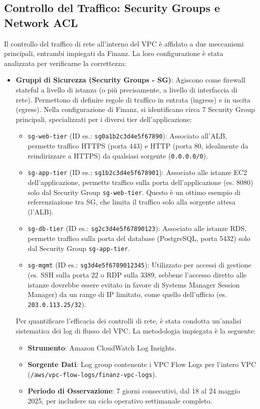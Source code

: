 \subsection{Controllo del Traffico: Security Groups e Network ACL}
\label{subsec:sg-nacl_cap2}
Il controllo del traffico di rete all'interno del VPC è affidato a due meccanismi principali, entrambi impiegati da Finanz. La loro configurazione è stata analizzata per verificarne la correttezza:
\begin{itemize}
\item \textbf{Gruppi di Sicurezza (Security Groups - SG)}: Agiscono come firewall stateful a livello di istanza (o più precisamente, a livello di interfaccia di rete). Permettono di definire regole di traffico in entrata (ingress) e in uscita (egress). Nella configurazione di Finanz, si identificano circa 7 Security Group principali, specializzati per i diversi tier dell'applicazione:
\begin{itemize}
\item \texttt{sg-web-tier} (ID es.: \texttt{sg\discretionary{-}{}{-}0a1b2c3d4e5f67890}): Associato all'ALB, permette traffico HTTPS (porta 443) e HTTP (porta 80, idealmente da reindirizzare a HTTPS) da qualsiasi sorgente (\texttt{0.0.0.0/0}).
\item \texttt{sg-app-tier} (ID es.: \texttt{sg\discretionary{-}{}{-}1b2c3d4e5f678901}): Associato alle istanze EC2 dell'applicazione, permette traffico sulla porta dell'applicazione (es. 8080) solo dal Security Group \texttt{sg-web-tier}. Questo è un ottimo esempio di referenziazione tra SG, che limita il traffico solo alla sorgente attesa (l'ALB).
\item \texttt{sg-db-tier} (ID es.: \texttt{sg\discretionary{-}{}{-}2c3d4e5f67890123}): Associato alle istanze RDS, permette traffico sulla porta del database (PostgreSQL, porta 5432) solo dal Security Group \texttt{sg-app-tier}.
\item \texttt{sg-mgmt} (ID es.: \texttt{sg\discretionary{-}{}{-}3d4e5f6789012345}): Utilizzato per accessi di gestione (es. SSH sulla porta 22 o RDP sulla 3389, sebbene l'accesso diretto alle istanze dovrebbe essere evitato in favore di Systems Manager Session Manager) da un range di IP limitato, come quello dell'ufficio (es. \texttt{203.0.113.25/32}).
\end{itemize}
Per quantificare l'efficacia dei controlli di rete, è stata condotta un'analisi sistematica dei log di flusso del VPC. La metodologia impiegata è la seguente:

\begin{itemize}
    \item \textbf{Strumento}: Amazon CloudWatch Log Insights.
    \item \textbf{Sorgente Dati}: Log group contenente i VPC Flow Logs per l'intero VPC (\texttt{/aws/vpc-flow-logs/finanz-vpc-logs}).
    \item \textbf{Periodo di Osservazione}: 7 giorni consecutivi, dal 18 al 24 maggio 2025, per includere un ciclo operativo settimanale completo.
\end{itemize}


\end{itemize}
